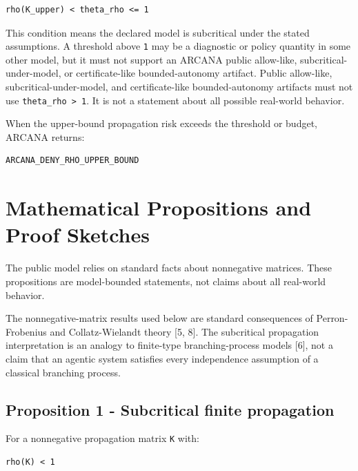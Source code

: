 \documentclass[
  american,
  a4paper,
  10pt]{article}
\begin{document}
\begin{Verbatim}[breaklines=true,breakanywhere=true,fontsize=\small]
rho(K_upper) < theta_rho <= 1
\end{Verbatim}

This condition means the declared model is subcritical under the stated assumptions. A
threshold above \texttt{1} may be a diagnostic or policy quantity in some other model,
but it must not support an ARCANA public allow-like, subcritical-under-model, or
certificate-like bounded-autonomy artifact. Public allow-like, subcritical-under-model,
and certificate-like bounded-autonomy artifacts must not use
\texttt{theta\_rho\ \textgreater{}\ 1}. It is not a statement about all possible
real-world behavior.

When the upper-bound propagation risk exceeds the threshold or budget, ARCANA returns:

\begin{Verbatim}[breaklines=true,breakanywhere=true,fontsize=\small]
ARCANA_DENY_RHO_UPPER_BOUND
\end{Verbatim}

\section{Mathematical Propositions and Proof
Sketches}\label{mathematical-propositions-and-proof-sketches}

The public model relies on standard facts about nonnegative matrices. These propositions
are model-bounded statements, not claims about all real-world behavior.

The nonnegative-matrix results used below are standard consequences of Perron-Frobenius
and Collatz-Wielandt theory {[}5, 8{]}. The subcritical propagation interpretation is an
analogy to finite-type branching-process models {[}6{]}, not a claim that an agentic
system satisfies every independence assumption of a classical branching process.

\subsection{Proposition 1 - Subcritical finite
propagation}\label{proposition-1---subcritical-finite-propagation}

For a nonnegative propagation matrix \texttt{K} with:

\begin{Verbatim}[breaklines=true,breakanywhere=true,fontsize=\small]
rho(K) < 1
\end{Verbatim}
\end{document}
